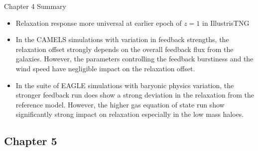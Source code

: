 \documentclass[11pt]{beamer}
\begin{document}



\begin{frame}{Chapter 4 Summary}
    \begin{itemize}
        \item Relaxation response more universal at earlier epoch of $z=1$ in IllustrisTNG
        \item  In the CAMELS simulations with variation in feedback strengths, the relaxation offset strongly depends on the overall feedback flux from the galaxies. However, the parameters controlling the feedback burstiness and the wind speed have negligible impact on the relaxation offset.
        \item In the suite of EAGLE simulations with baryonic physics variation, the stronger feedback run does show a strong deviation in the relaxation from the reference model. However, the higher gas equation of state run show significantly strong impact on relaxation especially in the low mass haloes.
    \end{itemize}
\end{frame}













\date[JCAP/ arXiv:2407.08030]{17 March 2025}
\subsection{Chapter 5}
\end{document}
